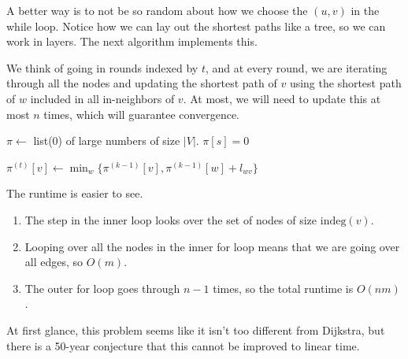   A better way is to not be so random about how we choose the $(u, v)$ in the while loop. Notice how we can lay out the shortest paths like a tree, so we can work in layers. The next algorithm implements this. 

  \begin{algo}
    We think of going in rounds indexed by $t$, and at every round, we are iterating through all the nodes and updating the shortest path of $v$ using the shortest path of $w$ included in all in-neighbors of $v$. At most, we will need to update this at most $n$ times, which will guarantee convergence.  
    \begin{algorithm}[H]
      \label{alg:bellman_ford}
      \begin{algorithmic}[1]
        \State $\pi \gets$ list(0) of large numbers of size $|V|$. 
        \State $\pi[s] = 0$

              \State $\pi^{(t)} [v] \gets \min_w \{ \pi^{(k-1)} [v], \pi^{(k-1)}[w] + l_{wv}\}$
            \EndFor 
          \EndFor
        \EndFunction
      \end{algorithmic}
    \end{algorithm}
    The runtime is easier to see. 
    \begin{enumerate}
      \item The step in the inner loop looks over the set of nodes of size $\mathrm{indeg}(v)$. 
      \item Looping over all the nodes in the inner for loop means that we are going over all edges, so $O(m)$. 
      \item The outer for loop goes through $n-1$ times, so the total runtime is $O(nm)$. 
    \end{enumerate}
  \end{algo}

  At first glance, this problem seems like it isn't too different from Dijkstra, but there is a 50-year conjecture that this cannot be improved to linear time. 

